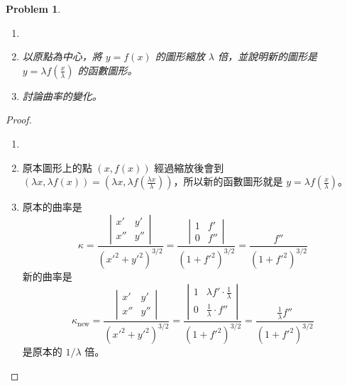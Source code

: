 \documentclass[10pt,a4paper]{article}
\newcounter{theProblemCounter}
\newtheorem{problem}[theProblemCounter]{Problem}
\begin{document}
\setcounter{theProblemCounter}{5}
\begin{problem}
\begin{enumerate}
\item[]
\item[(a)] 以原點為中心，將 $y=f(x)$ 的圖形縮放 $\lambda$ 倍，並說明新的圖形是 $y=\lambda f(\frac{x}{\lambda})$ 的函數圖形。
\item[(b)] 討論曲率的變化。
\end{enumerate}
\end{problem}
\begin{proof}
\begin{enumerate}
\item[]
\item[(a)] 原本圖形上的點 $(x, f(x))$ 經過縮放後會到 $(\lambda x, \lambda f(x)) = (\lambda x, \lambda f(\frac{\lambda x}{\lambda}))$，所以新的函數圖形就是 $y = \lambda f(\frac{x}{\lambda})$。
\item[(b)] 原本的曲率是
\begin{equation}
\kappa = \frac{\left|\begin{array}{cc} x' & y' \\ x'' & y''\end{array}
\right|
}{(x'^2+y'^2)^{3/2}}
= \frac{\left|\begin{array}{cc} 1 & f' \\ 0 & f''\end{array}
\right|
}{(1+f'^2)^{3/2}}
= \frac{f''}{(1+f'^2)^{3/2}}
\end{equation}
新的曲率是
\begin{equation}
\kappa_{\mbox{new}} = \frac{\left|\begin{array}{cc} x' & y' \\ x'' & y''\end{array}
\right|
}{(x'^2+y'^2)^{3/2}}
= \frac{\left|\begin{array}{cc} 1 & \lambda f'\cdot \frac{1}{\lambda} \\ 0 & \frac{1}{\lambda}\cdot f''\end{array}
\right|
}{(1+f'^2)^{3/2}}
= \frac{\frac{1}{\lambda}f''}{(1+f'^2)^{3/2}}
\end{equation}
是原本的 $1/\lambda$ 倍。
\end{enumerate}
\end{proof}
\end{document}
